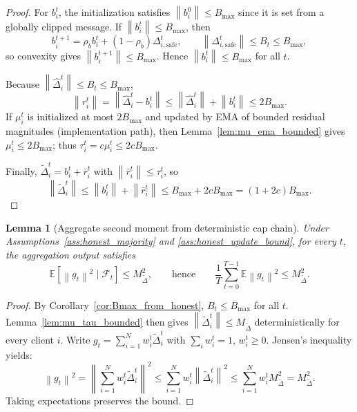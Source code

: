 \documentclass[11pt,a4paper]{article}
\newtheorem{lemma}{Lemma}
\theoremstyle{remark}
\newcommand{\E}{\mathbb{E}}
\newcommand{\F}{\mathcal{F}}
\newcommand{\norm}[1]{\left\lVert #1 \right\rVert}
\begin{document}
\begin{proof}
For \(b_i^t\), the initialization satisfies \(\norm{b_i^0}\le B_{\max}\) since
it is set from a globally clipped message. If \(\norm{b_i^t}\le B_{\max}\), then
\[
    b_i^{t+1}
    =
    \rho_b b_i^t + (1-\rho_b)\Delta_{i,\mathrm{safe}}^t,
    \qquad
    \norm{\Delta_{i,\mathrm{safe}}^t}\le B_t\le B_{\max},
\]
so convexity gives \(\norm{b_i^{t+1}}\le B_{\max}\). Hence
\(\norm{b_i^t}\le B_{\max}\) for all \(t\).

Because \(\norm{\hat\Delta_i^t}\le B_t\le B_{\max}\),
\[
    \norm{r_i^t}
    =
    \norm{\hat\Delta_i^t-b_i^t}
    \le
    \norm{\hat\Delta_i^t}+\norm{b_i^t}
    \le
    2B_{\max}.
\]
If \(\mu_i^t\) is initialized at most \(2B_{\max}\) and updated by EMA of
bounded residual magnitudes (implementation path), then
Lemma~\ref{lem:mu_ema_bounded} gives \(\mu_i^t\le 2B_{\max}\); thus
\(\tau_i^t=c\mu_i^t\le 2cB_{\max}\).

Finally, \(\tilde\Delta_i^t=b_i^t+\bar r_i^t\) with
\(\norm{\bar r_i^t}\le \tau_i^t\), so
\[
    \norm{\tilde\Delta_i^t}
    \le
    \norm{b_i^t}+\norm{\bar r_i^t}
    \le
    B_{\max}+2cB_{\max}
    =
    (1+2c)B_{\max}.
\]
\end{proof}

\begin{lemma}[Aggregate second moment from deterministic cap chain]
\label{lem:g_second_derived}
Under Assumptions~\ref{ass:honest_majority} and
\ref{ass:honest_update_bound}, for every \(t\), the aggregation output satisfies
\begin{equation}
    \E\!\left[\norm{g_t}^2 \mid \F_t\right]
    \le
    M_{\tilde\Delta}^2,
    \qquad\text{hence}\qquad
    \frac{1}{T}\sum_{t=0}^{T-1}\E\norm{g_t}^2 \le M_{\tilde\Delta}^2.
    \label{eq:Gg_derived}
\end{equation}
\end{lemma}

\begin{proof}
By Corollary~\ref{cor:Bmax_from_honest}, \(B_t\le B_{\max}\) for all \(t\). 
Lemma~\ref{lem:mu_tau_bounded} then gives \(\norm{\tilde\Delta_i^t}\le M_{\tilde\Delta}\) deterministically for every client \(i\). 
Write \(g_t=\sum_{i=1}^N w_i^t \tilde{\Delta}_i^t\) with \(\sum_i w_i^t=1\),
\(w_i^t\ge 0\). Jensen's inequality yields:
\[
    \norm{g_t}^2 = \norm{\sum_{i=1}^N w_i^t \tilde{\Delta}_i^t}^2
    \le
    \sum_{i=1}^N w_i^t \norm{\tilde{\Delta}_i^t}^2
    \le 
    \sum_{i=1}^N w_i^t M_{\tilde\Delta}^2 = M_{\tilde\Delta}^2.
\]
Taking expectations preserves the bound.
\end{proof}
\end{document}
